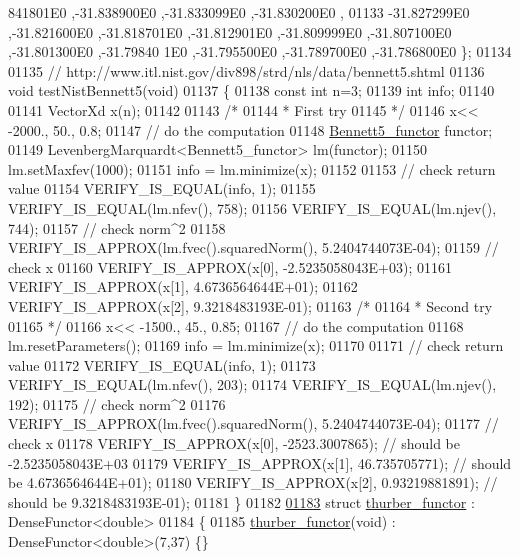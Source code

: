\begin{DoxyCode}
      841801E0 ,-31.838900E0 ,-31.833099E0 ,-31.830200E0 ,
01133 -31.827299E0 ,-31.821600E0 ,-31.818701E0 ,-31.812901E0 ,-31.809999E0 ,-31.807100E0 ,-31.801300E0 ,-31.79840
      1E0 ,-31.795500E0 ,-31.789700E0 ,-31.786800E0 \};
01134 
01135 \textcolor{comment}{// http://www.itl.nist.gov/div898/strd/nls/data/bennett5.shtml}
01136 \textcolor{keywordtype}{void} testNistBennett5(\textcolor{keywordtype}{void})
01137 \{
01138   \textcolor{keyword}{const} \textcolor{keywordtype}{int}  n=3;
01139   \textcolor{keywordtype}{int} info;
01140 
01141   VectorXd x(n);
01142 
01143   \textcolor{comment}{/*}
01144 \textcolor{comment}{   * First try}
01145 \textcolor{comment}{   */}
01146   x<< -2000., 50., 0.8;
01147   \textcolor{comment}{// do the computation}
01148   \hyperlink{struct_bennett5__functor}{Bennett5\_functor} functor;
01149   LevenbergMarquardt<Bennett5\_functor> lm(functor);
01150   lm.setMaxfev(1000);
01151   info = lm.minimize(x);
01152 
01153   \textcolor{comment}{// check return value}
01154   VERIFY\_IS\_EQUAL(info, 1);
01155   VERIFY\_IS\_EQUAL(lm.nfev(), 758);
01156   VERIFY\_IS\_EQUAL(lm.njev(), 744);
01157   \textcolor{comment}{// check norm^2}
01158   VERIFY\_IS\_APPROX(lm.fvec().squaredNorm(), 5.2404744073E-04);
01159   \textcolor{comment}{// check x}
01160   VERIFY\_IS\_APPROX(x[0], -2.5235058043E+03);
01161   VERIFY\_IS\_APPROX(x[1], 4.6736564644E+01);
01162   VERIFY\_IS\_APPROX(x[2], 9.3218483193E-01);
01163   \textcolor{comment}{/*}
01164 \textcolor{comment}{   * Second try}
01165 \textcolor{comment}{   */}
01166   x<< -1500., 45., 0.85;
01167   \textcolor{comment}{// do the computation}
01168   lm.resetParameters();
01169   info = lm.minimize(x);
01170 
01171   \textcolor{comment}{// check return value}
01172   VERIFY\_IS\_EQUAL(info, 1);
01173   VERIFY\_IS\_EQUAL(lm.nfev(), 203);
01174   VERIFY\_IS\_EQUAL(lm.njev(), 192);
01175   \textcolor{comment}{// check norm^2}
01176   VERIFY\_IS\_APPROX(lm.fvec().squaredNorm(), 5.2404744073E-04);
01177   \textcolor{comment}{// check x}
01178   VERIFY\_IS\_APPROX(x[0], -2523.3007865); \textcolor{comment}{// should be -2.5235058043E+03}
01179   VERIFY\_IS\_APPROX(x[1], 46.735705771); \textcolor{comment}{// should be 4.6736564644E+01);}
01180   VERIFY\_IS\_APPROX(x[2], 0.93219881891); \textcolor{comment}{// should be 9.3218483193E-01);}
01181 \}
01182 
\hyperlink{structthurber__functor}{01183} \textcolor{keyword}{struct }\hyperlink{structthurber__functor}{thurber\_functor} : DenseFunctor<double>
01184 \{
01185     \hyperlink{structthurber__functor}{thurber\_functor}(\textcolor{keywordtype}{void}) : DenseFunctor<double>(7,37) \{\}

\end{DoxyCode}
